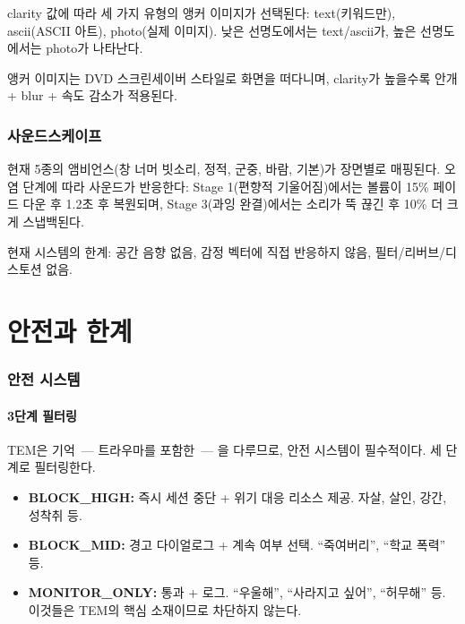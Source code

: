 \documentclass[11pt, a4paper]{article}
\begin{document}
clarity 값에 따라 세 가지 유형의 앵커 이미지가 선택된다: text(키워드만), ascii(ASCII 아트), photo(실제 이미지). 낮은 선명도에서는 text/ascii가, 높은 선명도에서는 photo가 나타난다.

앵커 이미지는 DVD 스크린세이버 스타일로 화면을 떠다니며, clarity가 높을수록 안개 + blur + 속도 감소가 적용된다.


\section{사운드스케이프}

현재 5종의 앰비언스(창 너머 빗소리, 정적, 군중, 바람, 기본)가 장면별로 매핑된다. 오염 단계에 따라 사운드가 반응한다: Stage 1(편향적 기울어짐)에서는 볼륨이 15\% 페이드 다운 후 1.2초 후 복원되며, Stage 3(과잉 완결)에서는 소리가 뚝 끊긴 후 10\% 더 크게 스냅백된다.

현재 시스템의 한계: 공간 음향 없음, 감정 벡터에 직접 반응하지 않음, 필터/리버브/디스토션 없음.



\part{안전과 한계}

\section{안전 시스템}

\subsection{3단계 필터링}

TEM은 기억~--- 트라우마를 포함한~--- 을 다루므로, 안전 시스템이 필수적이다. 세 단계로 필터링한다.

\begin{itemize}
    \item \textbf{BLOCK\_HIGH:} 즉시 세션 중단 + 위기 대응 리소스 제공. 자살, 살인, 강간, 성착취 등.
    \item \textbf{BLOCK\_MID:} 경고 다이얼로그 + 계속 여부 선택. ``죽여버리'', ``학교 폭력'' 등.
    \item \textbf{MONITOR\_ONLY:} 통과 + 로그. ``우울해'', ``사라지고 싶어'', ``허무해'' 등. 이것들은 TEM의 핵심 소재이므로 차단하지 않는다.
\end{itemize}
\end{document}
